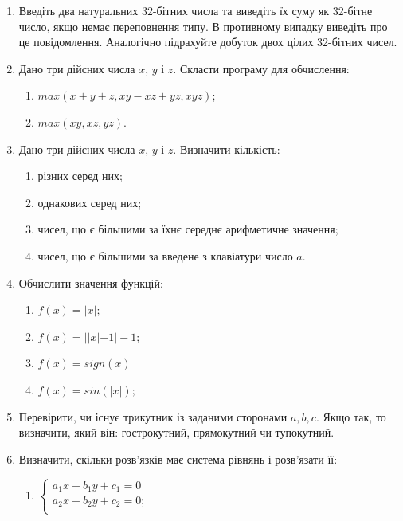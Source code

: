 \documentclass[a5paper,titlepage,openany,twoside,draft]{book_unv}%
\makeatletter
\newcommand{\xslalph}[1]{\expandafter\@xslalph\csname c@#1\endcsname}
\newcommand{\@xslalph}[1]{%
    \ifcase#1\or а\or б\or в\or г\or д\or e\or є\or ж\or з\or i%
    \or й\or к\or л\or м\or н\or о\or п\or р\or с\or т%
    \or у\or ф\or х\or ц\or ч\or ш\or ю\or я\or аа\or бб\or вв%
    \else\@ctrerr\fi%
}
\makeatother
\begin{document}
\begin{enumerate}
\def\labelenumi{\arabic{enumi})}
\setcounter{enumi}{7}
\item
  Введіть два натуральних 32-бітних числа та виведіть їх суму як
  32-бітне число, якщо немає переповнення типу. В противному випадку
  виведіть про це повідомлення. Аналогічно підрахуйте добуток двох цілих
  32-бітних чисел.
\item
  Дано три дійсних числа $x$, $y$ і $z$. Скласти програму для
  обчислення:
\begin{enumerate}[label=\xslalph*)]
\item
  \(max(x + y + z,xy- xz + yz,xyz)\);
\item
  \(max(xy,xz,yz)\).
\end{enumerate}

\item
  Дано три дійсних числа $x$, $y$ і $z$. Визначити кількість:
\begin{enumerate}[label=\xslalph*)]
\item різних серед них; 
\item однакових серед них;
\item чисел, що є більшими за їхнє середнє арифметичне значення;
\item чисел, що є більшими за введене з клавіатури число \(a\).
\end{enumerate}

\item
  Обчислити значення функцій:
  \begin{multicols}{2}
\begin{enumerate}[label=\xslalph*)]
\item \(f(x) = |x|;\) \item \(f(x) = ||x| - 1| - 1;\)
\item \(f(x) = sign(x)\) \item \(f(x) = sin(|x|);\)
\end{enumerate}
  \end{multicols}

\item
  Перевірити, чи існує трикутник із заданими сторонами $a,b,c$.
  Якщо так, то визначити, який він: гострокутний, прямокутний чи
  тупокутний.

\item
  Визначити, скільки розв'язків має система рівнянь і розв'язати її:
  \begin{multicols}{2}
\begin{enumerate}[label=\xslalph*)]
\item \(\left\{ \begin{matrix}
a_{1}x + b_{1}y + c_{1} = 0 \\
a_{2}x + b_{2}y + c_{2} = 0; \\
\end{matrix} \right.\ \) 


\end{enumerate}
\end{multicols}
\end{enumerate}
\end{document}
